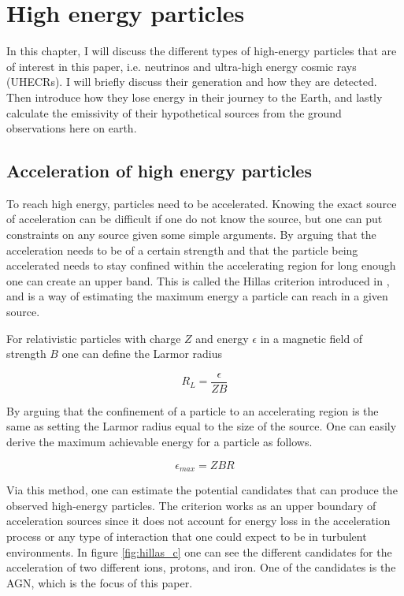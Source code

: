 \section{High energy particles}

In this chapter, I will discuss the different types of high-energy particles that are of interest in this paper, i.e. neutrinos and ultra-high energy cosmic rays (UHECRs).
I will briefly discuss their generation and how they are detected. Then introduce how they lose energy in their journey to the Earth, and lastly calculate the emissivity of their hypothetical sources from the ground 
observations here on earth. 

\subsection{Acceleration of high energy particles}

To reach high energy, particles need to be accelerated. 
Knowing the exact source of acceleration can be difficult if one do not know the source, but one can put constraints on any source given some simple arguments.
By arguing that the acceleration needs to be of a certain strength and that the particle being accelerated needs to stay confined within the accelerating region for long enough one can create an upper band.
This is called the Hillas criterion introduced in \cite{Hillas_1984}, and is a way of estimating the maximum energy a particle can reach in a given source.%

For relativistic particles with charge $Z$ and energy $\epsilon$ in a magnetic field of strength $B$ one can define the Larmor radius


\begin{equation}
    R_L = \frac{\epsilon}{ZB}
\end{equation}

By arguing that the confinement of a particle to an accelerating region is the same as setting the Larmor radius equal to the size of the source. One can 
easily derive the maximum achievable energy for a particle as follows.%

\begin{equation}
    \epsilon_{max} = ZBR
\end{equation}

Via this method, one can estimate the potential candidates that can produce the observed high-energy particles. 
The criterion works as an upper boundary of acceleration sources since it does not account for energy loss in the acceleration process or any type of interaction that one could expect to be in turbulent environments.
In figure \ref{fig:hillas_c} one can see the different candidates for the acceleration of two different ions, protons, and iron. One of the candidates is the AGN, which is the focus of this paper.


